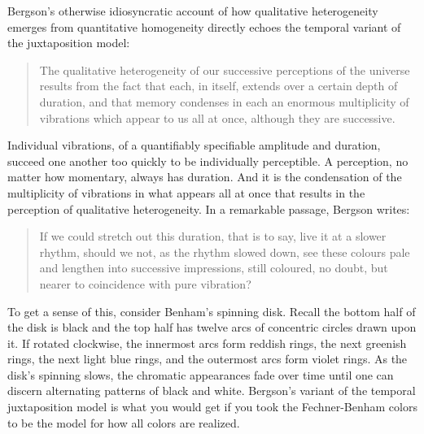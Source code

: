 Bergson's \citeyearpar[75--77]{Bergson:1912pi} otherwise idiosyncratic account of how qualitative heterogeneity emerges from quantitative homogeneity directly echoes the temporal variant of the juxtaposition model:
\begin{quote}
	The qualitative heterogeneity of our successive perceptions of the universe results from the fact that each, in itself, extends over a certain depth of duration, and that memory condenses in each an enormous multiplicity of vibrations which appear to us all at once, although they are successive. \citep[76--77]{Bergson:1912pi}
\end{quote}
Individual vibrations, of a quantifiably specifiable amplitude and duration, succeed one another too quickly to be individually perceptible. A perception, no matter how momentary, always has duration. And it is the condensation of the multiplicity of vibrations in what appears all at once that results in the perception of qualitative heterogeneity. In a remarkable passage, Bergson writes:
\begin{quote}
	If we could stretch out this duration, that is to say, live it at a slower rhythm, should we not, as the rhythm slowed down, see these colours pale and lengthen into successive impressions, still coloured, no doubt, but nearer to coincidence with pure vibration? \citep[268--269]{Bergson:1912pi}
\end{quote}
To get a sense of this, consider Benham's spinning disk. Recall the bottom half of the disk is black and the top half has twelve arcs of concentric circles drawn upon it. If rotated clockwise, the innermost arcs form reddish rings, the next greenish rings, the next light blue rings, and the outermost arcs form violet rings. As the disk's spinning slows, the chromatic appearances fade over time until one can discern alternating patterns of black and white. Bergson's variant of the temporal juxtaposition model is what you would get if you took the Fechner-Benham colors to be the model for how all colors are realized.

